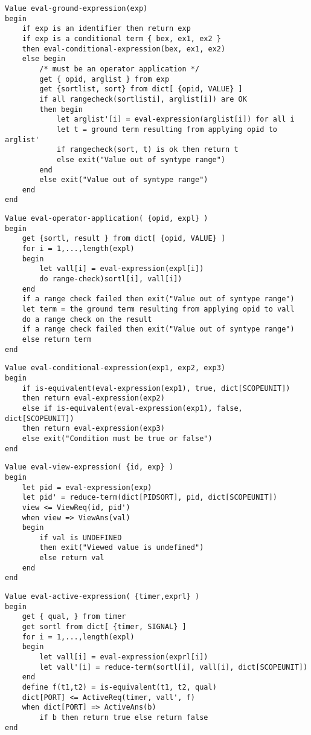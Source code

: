 \begin{verbatim}
Value eval-ground-expression(exp)
begin
    if exp is an identifier then return exp
    if exp is a conditional term { bex, ex1, ex2 } 
    then eval-conditional-expression(bex, ex1, ex2)
    else begin
        /* must be an operator application */
        get { opid, arglist } from exp
        get {sortlist, sort} from dict[ {opid, VALUE} ]
        if all rangecheck(sortlisti], arglist[i]) are OK
        then begin
            let arglist'[i] = eval-expression(arglist[i]) for all i
            let t = ground term resulting from applying opid to arglist'
            if rangecheck(sort, t) is ok then return t
            else exit("Value out of syntype range")
        end 
        else exit("Value out of syntype range")
    end
end
\end{verbatim}

\begin{verbatim}
Value eval-operator-application( {opid, expl} )
begin
    get {sortl, result } from dict[ {opid, VALUE} ]
    for i = 1,...,length(expl)
    begin
        let vall[i] = eval-expression(expl[i])
        do range-check)sortl[i], vall[i])
    end
    if a range check failed then exit("Value out of syntype range")
    let term = the ground term resulting from applying opid to vall
    do a range check on the result
    if a range check failed then exit("Value out of syntype range")
    else return term    
end
\end{verbatim}

\begin{verbatim}
Value eval-conditional-expression(exp1, exp2, exp3)
begin
    if is-equivalent(eval-expression(exp1), true, dict[SCOPEUNIT])
    then return eval-expression(exp2)
    else if is-equivalent(eval-expression(exp1), false, dict[SCOPEUNIT])
    then return eval-expression(exp3)
    else exit("Condition must be true or false")
end
\end{verbatim}

\begin{verbatim}
Value eval-view-expression( {id, exp} )
begin
    let pid = eval-expression(exp)
    let pid' = reduce-term(dict[PIDSORT], pid, dict[SCOPEUNIT])
    view <= ViewReq(id, pid')
    when view => ViewAns(val)
    begin
        if val is UNDEFINED
        then exit("Viewed value is undefined")
        else return val
    end
end
\end{verbatim}

\begin{verbatim}
Value eval-active-expression( {timer,exprl} )
begin
    get { qual, } from timer
    get sortl from dict[ {timer, SIGNAL} ]
    for i = 1,...,length(expl)
    begin
        let vall[i] = eval-expression(exprl[i])
        let vall'[i] = reduce-term(sortl[i], vall[i], dict[SCOPEUNIT])
    end
    define f(t1,t2) = is-equivalent(t1, t2, qual)
    dict[PORT] <= ActiveReq(timer, vall', f)
    when dict[PORT] => ActiveAns(b)
        if b then return true else return false
end
\end{verbatim}

